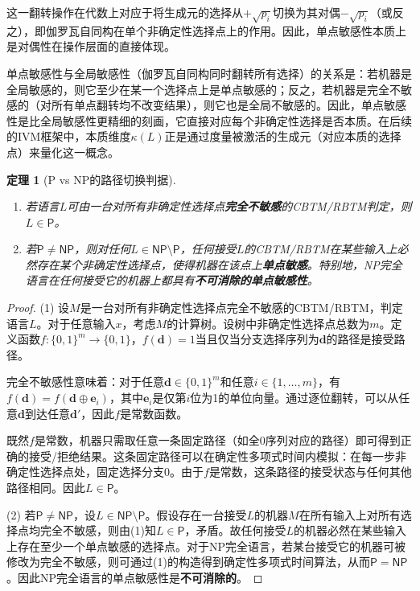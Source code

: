 \documentclass{ctexart}
\newtheorem{theorem}{定理}[section]
\newtheorem{proof}[theorem]{证明}
\begin{document}
	这一翻转操作在代数上对应于将生成元的选择从$+\sqrt{p_i}$切换为其对偶$-\sqrt{p_i}$（或反之），即伽罗瓦自同构在单个非确定性选择点上的作用。因此，单点敏感性本质上是对偶性在操作层面的直接体现。
	
	单点敏感性与全局敏感性（伽罗瓦自同构同时翻转所有选择）的关系是：若机器是全局敏感的，则它至少在某一个选择点上是单点敏感的；反之，若机器是完全不敏感的（对所有单点翻转均不改变结果），则它也是全局不敏感的。因此，单点敏感性是比全局敏感性更精细的刻画，它直接对应每个非确定性选择是否本质。在后续的IVM框架中，本质维度$\kappa(L)$正是通过度量被激活的生成元（对应本质的选择点）来量化这一概念。
	
	\begin{theorem}[P vs NP的路径切换判据]\label{thm:path-switch}
		\begin{enumerate}
			\item 若语言$L$可由一台对所有非确定性选择点\textbf{完全不敏感}的CBTM/RBTM判定，则$L \in \mathsf{P}$。
			\item 若$\mathsf{P} \neq \mathsf{NP}$，则对任何$L \in \mathsf{NP} \setminus \mathsf{P}$，任何接受$L$的CBTM/RBTM在某些输入上必然存在某个非确定性选择点，使得机器在该点上\textbf{单点敏感}。特别地，NP完全语言在任何接受它的机器上都具有\textbf{不可消除的单点敏感性}。
		\end{enumerate}
	\end{theorem}
	\begin{proof}
		(1) 设$M$是一台对所有非确定性选择点完全不敏感的CBTM/RBTM，判定语言$L$。对于任意输入$x$，考虑$M$的计算树。设树中非确定性选择点总数为$m$。定义函数$f: \{0,1\}^m \to \{0,1\}$，$f(\mathbf{d}) = 1$当且仅当分支选择序列为$\mathbf{d}$的路径是接受路径。
		
		完全不敏感性意味着：对于任意$\mathbf{d} \in \{0,1\}^m$和任意$i \in \{1,\dots,m\}$，有$f(\mathbf{d}) = f(\mathbf{d} \oplus \mathbf{e}_i)$，其中$\mathbf{e}_i$是仅第$i$位为1的单位向量。通过逐位翻转，可以从任意$\mathbf{d}$到达任意$\mathbf{d}'$，因此$f$是常数函数。
		
		既然$f$是常数，机器只需取任意一条固定路径（如全0序列对应的路径）即可得到正确的接受/拒绝结果。这条固定路径可以在确定性多项式时间内模拟：在每一步非确定性选择点处，固定选择分支0。由于$f$是常数，这条路径的接受状态与任何其他路径相同。因此$L \in \mathsf{P}$。
		
		(2) 若$\mathsf{P} \neq \mathsf{NP}$，设$L \in \mathsf{NP} \setminus \mathsf{P}$。假设存在一台接受$L$的机器$M$在所有输入上对所有选择点均完全不敏感，则由(1)知$L \in \mathsf{P}$，矛盾。故任何接受$L$的机器必然在某些输入上存在至少一个单点敏感的选择点。对于NP完全语言，若某台接受它的机器可被修改为完全不敏感，则可通过(1)的构造得到确定性多项式时间算法，从而$\mathsf{P} = \mathsf{NP}$。因此NP完全语言的单点敏感性是\textbf{不可消除的}。
	\end{proof}
	
\end{document}
